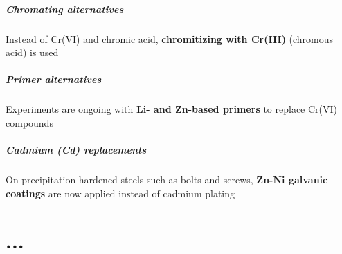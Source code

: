 \documentclass{article}
\begin{document}
\subsubsection{Chromating alternatives}
Instead of Cr(VI) and chromic acid, \textbf{chromitizing with Cr(III)} (chromous acid) is used

\subsubsection{Primer alternatives}
Experiments are ongoing with \textbf{Li- and Zn-based primers} to replace Cr(VI) compounds

\subsubsection{Cadmium (Cd) replacements}
On precipitation-hardened steels such as bolts and screws, \textbf{Zn-Ni galvanic coatings}
are now applied instead of cadmium plating

\newpage
\part{...}


\newpage
\appendix
\printacronyms[name=Glossary, heading=section]
\newpage

\vspace*{-1cm}
\printnomenclature
\end{document}
